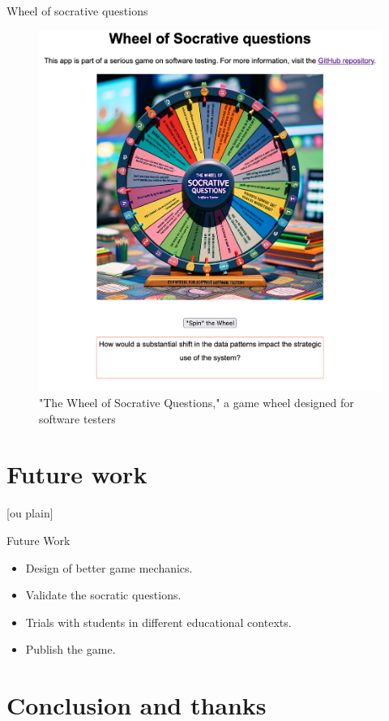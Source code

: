 \documentclass[aspectratio=169]{beamer}
\begin{document}
\begin{frame}{Wheel of socrative questions}
\begin{figure}
    \centering
    \includegraphics[width=0.5\linewidth]{images//wheel}
    \caption{"The Wheel of Socrative Questions," a game wheel designed for software testers}
\end{figure}
\end{frame}

\section{Future work}

[ou plain]
\begin{frame}{Future Work}
    \begin{itemize}
        \item Design of better game mechanics.
        \item Validate the socratic questions.
        \item Trials with students in different educational contexts.
        \item Publish the game.
    \end{itemize}
\end{frame}

\section{Conclusion and thanks}

\end{document}
